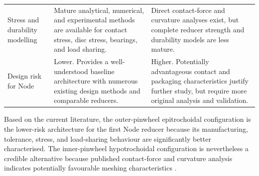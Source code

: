 \documentclass[internal]{../../../classes/nervtech-research}
\begin{document}
\begin{table}[H]
\begin{tabular}{p{} p{} p{}}
    Stress and durability modelling &
    Mature analytical, numerical, and experimental methods are available for
    contact stress, disc stress, bearings, and load sharing. &
    Direct contact-force and curvature analyses exist, but complete reducer
    strength and durability models are less mature. \\

    Design risk for Node &
    Lower.
    Provides a well-understood baseline architecture with numerous existing
    design methods and comparable reducers. &
    Higher.
    Potentially advantageous contact and packaging characteristics justify
    further study, but require more original analysis and validation. \\

    \hline
  \end{tabular}
\end{table}
\newpage
Based on the current literature, the outer-pinwheel epitrochoidal configuration
is the lower-risk architecture for the first Node reducer because its
manufacturing, tolerance, stress, and load-sharing behaviour are significantly
better characterised.
The inner-pinwheel hypotrochoidal configuration is nevertheless a credible
alternative because published contact-force and curvature analysis indicates
potentially favourable meshing characteristics \cite{CycloidalKinematics}.

\clearpage
\end{document}
